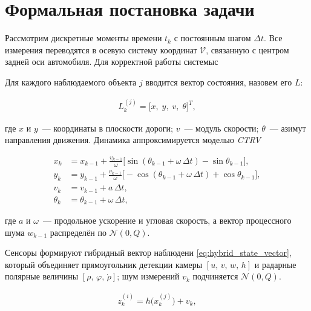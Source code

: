 \section{Формальная постановка задачи}

Рассмотрим дискретные моменты времени $t_k$ с постоянным шагом $\Delta t$.
Все измерения переводятся в осевую систему координат \(\mathcal{V}\),
связанную с центром задней оси автомобиля. Для корректной работы системыс

Для каждого наблюдаемого объекта $j$ вводится вектор состояния, назовем его $L$:

\begin{equation}
\label{fff}
  \begin{aligned}
    L_k^{(j)} = \bigl[x,\;y,\;v,\;\theta\bigr]^{T},
  \end{aligned}
\end{equation}

где $x$ и $y$~— координаты в плоскости дороги; $v$~— модуль скорости;
$\theta$~— азимут направления движения.
Динамика аппроксимируется моделью \textit{CTRV}\cite{li2023vehicle}

\begin{equation}
\label{eq:nctrv}
  \begin{aligned}
    x_k &= x_{k-1} + \frac{v_{k-1}}{\omega}\bigl[\sin(\theta_{k-1}+\omega\,\Delta t)-\sin\theta_{k-1}\bigr],\\
    y_k &= y_{k-1} + \frac{v_{k-1}}{\omega}\bigl[-\cos(\theta_{k-1}+\omega\,\Delta t)+\cos\theta_{k-1}\bigr],\\
    v_k &= v_{k-1} + a\,\Delta t,\\
    \theta_k &= \theta_{k-1}+\omega\,\Delta t,
  \end{aligned}
\end{equation}

\noindent где $a$ и $\omega$~— продольное ускорение и угловая скорость,
а вектор процессного шума $w_{k-1}$ распределён по
$\mathcal N(0, Q)$.

Сенсоры формируют гибридный вектор наблюдени \ref{eq:hybrid_state_vector}, который объединяет прямоугольник детекции камеры
$[u,\,v,\,w,\,h]$ и радарные полярные величины
$[\rho,\,\varphi,\,\dot{\rho}]$;
шум измерений $v_k$ подчиняется
$\mathcal N(0, Q)$. 

\begin{equation}
  \label{eq:hybrid_state_vector}
  \begin{aligned}
    z_k^{(i)} = h\bigl(x_k^{(j)}\bigr) + v_k,
  \end{aligned}
\end{equation}



